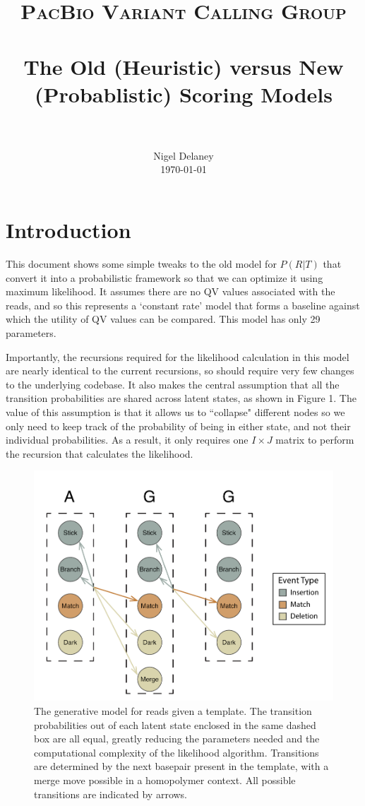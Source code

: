 \documentclass[paper=a4, fontsize=11pt]{scrartcl}
\title{
		\usefont{OT1}{bch}{b}{n}
		\normalfont \normalsize \textsc{PacBio Variant Calling Group} \\ [25pt]
		\horrule{0.5pt} \\[0.4cm]
		\huge The Old (Heuristic) versus New (Probablistic) Scoring Models\\
		\horrule{2pt} \\[0.5cm]
}
\author{
		\normalfont 								\normalsize
        Nigel Delaney\\[-3pt]		\normalsize
        \today
}
\date{}
\numberwithin{equation}{section}		%
\numberwithin{figure}{section}			%
\numberwithin{table}{section}				%
\begin{document}
\maketitle

\section{Introduction}

This document shows some simple tweaks to the old model for $P(R|T)$ that convert it into a probabilistic framework so that we can optimize it using maximum likelihood.  It assumes there are no QV values associated with the reads, and so this represents a `constant rate' model that forms a baseline against which the utility of QV values can be compared.   This model has only 29 parameters.
  
Importantly, the recursions required for the likelihood calculation in this model are nearly identical to the current recursions, so should require very few changes to the underlying codebase.  It also makes the central assumption that all the transition probabilities are shared across latent states, as shown in Figure 1.  The value of this assumption is that it allows us to ``collapse" different nodes so we only need to keep track of the probability of being in either state, and not their individual probabilities.  As a result, it only requires one $I \times J$ matrix to perform the recursion that calculates the likelihood.


\begin{figure}[H] %
	\includegraphics{CCSScoring}
		\caption{The generative model for reads given a template.  The transition probabilities out of each latent state enclosed in the same dashed box are all equal, greatly reducing the parameters needed and the computational complexity of the likelihood algorithm.  Transitions are determined by the next basepair present in the template, with a merge move possible in a homopolymer context.  All possible transitions are indicated by arrows.}
\end{figure}
\end{document}

